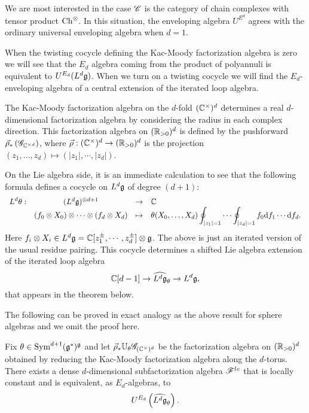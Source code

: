 \documentclass[10pt]{amsart}
\def\Ch{{\rm Ch}}
\begin{document}
We are most interested in the case $\mathscr C$ is the category of chain complexes with tensor product $\Ch^{\tensor}$. 
In this situation, the enveloping algebra $U^{E^d}$ agrees with the ordinary universal enveloping algebra when $d=1$.

When the twisting cocycle defining the Kac-Moody factorization algebra is zero we will see that the $E_d$ algebra coming from the product of polyannuli is equivalent to $U^{E_d} (L^d \mathfrak g)$.
When we turn on a twisting cocycle we will find the $E_d$-enveloping algebra of a central extension of the iterated loop algebra. 

The Kac-Moody factorization algebra on the $d$-fold $(\mathbb C^\times)^d$ determines a real $d$-dimensional factorization algebra by considering the radius in each complex direction. 
This factorization algebra on $(\mathbb R_{>0})^d$ is defined by the pushforward $\vec{\rho}_*\left(\mathscr G_{\mathbb C^{\times d}}\right)$, 
where $\vec{\rho} : (\mathbb C^\times)^d \to (\mathbb R_{>0})^d$ is the projection $(z_1,\ldots,z_d) \mapsto (|z_1|, \cdots, |z_d|)$. 

On the Lie algebra side, it is an immediate calculation to see that the following formula defines a cocycle on $L^d \mathfrak g$ of degree $(d+1)$:
\[
\begin{array}{cccl}
\displaystyle L^d \theta : & (L^d \mathfrak g)^{\otimes d + 1} & \to & \mathbb C \\
\displaystyle & (f_0 \otimes X_0)\otimes \cdots \otimes (f_d \otimes X_d) & \mapsto & \displaystyle  \theta(X_0,\ldots,X_d)  \oint_{|z_1| = 1} \cdots \oint_{|z_d| = 1} f_0 {\rm d} f_1 \cdots {\rm d} f_d .
\end{array}
\]
Here $f_i \otimes X_i \in L^d \mathfrak g = \mathbb C[z_1^{\pm}, \cdots, z_d^{\pm}] \otimes \mathfrak g$. 
The above is just an iterated version of the usual residue pairing.
This cocycle determines a shifted Lie algebra extension of the iterated loop algebra
\[
\mathbb C[d-1] \to \widehat{L^d \mathfrak g}_\theta \to L^d \mathfrak g,
\]
that appears in the theorem below. 

The following can be proved in exact analogy as the above result for sphere algebras and we omit the proof here.

\begin{prop}
Fix $\theta \in {\rm Sym}^{d+1}(\mathfrak g^*)^\mathfrak g$ and let $\vec{\rho}_* \mathbb U_\theta \mathscr G_{(\mathbb C^\times)^d}$ be the factorization algebra on $(\mathbb R_{>0})^d$ obtained by reducing the Kac-Moody factorization algebra along the $d$-torus.
There exists a dense $d$-dimensional subfactorization algebra $\mathscr F^{lc}$ that is locally constant and is equivalent, as $E_d$-algebras, to
\[
U^{E_d} \left( \widehat{L^d \mathfrak g}_{\theta} \right) .
\]
\end{prop}
\end{document}
